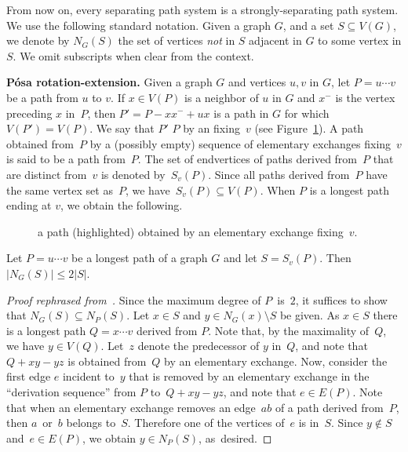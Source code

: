 From now on, every separating path system is a strongly-separating path system.
We use the following standard notation.
Given a graph \(G\), and  a set \(S\subseteq V(G)\),
we denote by \(N_G(S)\) the set of vertices \emph{not} in $S$ adjacent in \(G\) to some vertex in \(S\).
We omit subscripts when clear from the context.



\medskip
\noindent\textbf{Pósa rotation-extension.}
Given a graph $G$ and vertices $u, v$ in \(G\), let \(P = u \cdots v\) be a path from $u$ to $v$.
If \(x\in V(P)\) is a neighbor of \(u\) in \(G\)
and \(x^-\) is the vertex preceding \(x\) in~\(P\),
then \(P' = P-xx^- + ux\) is a path in \(G\) for which \(V(P') = V(P)\).
We say that \(P'\)  \(P\) by an
 fixing~\(v\) (see Figure~\ref{fig:rotation}).
A path obtained from~\(P\) by a (possibly empty) sequence of elementary exchanges fixing~\(v\)
is said to be a path  from~\(P\).
The set of endvertices of paths derived from~\(P\) that are distinct from~\(v\) is denoted by~\(S_v(P)\).
Since all paths derived from~\(P\) have the same vertex set as~\(P\), we have~\(S_v(P) \subseteq V(P)\).
When \(P\) is a longest path ending at \(v\), we obtain the following.

\begin{figure}[t]
          \begin{center}
            
            \caption{a path (highlighted)
              obtained by an elementary exchange fixing~\(v\).
            }\label{fig:rotation}
          \end{center}
\end{figure}




\begin{lemma}\label{lemma:brandt}
  Let  \(P = u \cdots v\) be a longest path of a graph $G$
  and let \(S = S_v(P)\). Then \(|N_G(S)| \leq 2|S|\).
\end{lemma}


\begin{proof}[{Proof rephrased from~{\cite[Lemma 2.6]{brandt2006global}}}]
  Since the maximum degree of \(P\)~is~\(2\), it suffices to show  that \(N_G(S) \subseteq N_P(S)\).
  Let \(x\in S\) and \(y\in N_G(x)\setminus S\) be given.
  As \(x\in S\) there is a longest path \(Q = x \cdots v\) derived from \(P\).
  Note that, by the maximality of~\(Q\), we have $y\in V(Q)$.
  Let~\(z\) denote the predecessor of \(y\) in~\(Q\),
  and note that \(Q + xy - yz\) is obtained from~\(Q\) by an elementary exchange.
  Now, consider the first edge \(e\) incident to~\(y\) that is removed by
  an elementary exchange in the ``derivation sequence'' from \(P\) to~\(Q + xy - yz\),
  and note that \(e\in E(P)\).
  Note that when an elementary exchange removes an edge~\(ab\) of a path derived from~\(P\),
  then \(a\)~or~\(b\) belongs to~\(S\).
  Therefore one of the vertices of~$e$ is in~$S$. Since $y \not\in S$ and~$e \in E(P)$,
  we obtain \(y\in N_P(S)\), as~desired.
\end{proof}


